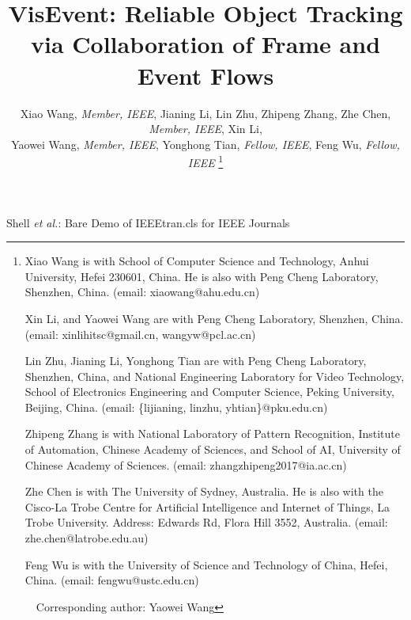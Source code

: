 \documentclass[journal]{IEEEtran}
\begin{document}
\title{VisEvent: Reliable Object Tracking via Collaboration of Frame and Event Flows} 

\author{Xiao Wang, \emph{Member, IEEE}, Jianing Li, Lin Zhu, Zhipeng Zhang, Zhe Chen, \emph{Member, IEEE},  Xin Li, \\ 
Yaowei Wang, \emph{Member, IEEE}, Yonghong Tian, \emph{Fellow, IEEE}, Feng Wu, \emph{Fellow, IEEE} 
\thanks{
Xiao Wang is with School of Computer Science and Technology, Anhui University, Hefei 230601, China. He is also with Peng Cheng Laboratory, Shenzhen, China. (email: xiaowang@ahu.edu.cn) 

Xin Li, and Yaowei Wang are with Peng Cheng Laboratory, Shenzhen, China. (email: xinlihitsc@gmail.cn, wangyw@pcl.ac.cn) 

Lin Zhu, Jianing Li, Yonghong Tian are with Peng Cheng Laboratory, Shenzhen, China, and National Engineering Laboratory for Video Technology, School of Electronics Engineering and Computer Science, Peking University, Beijing, China. (email: \{lijianing, linzhu, yhtian\}@pku.edu.cn) 

Zhipeng Zhang is with National Laboratory of Pattern Recognition, Institute of Automation, Chinese Academy of Sciences, and School of AI, University of Chinese Academy of Sciences. (email: zhangzhipeng2017@ia.ac.cn)  

Zhe Chen is with The University of Sydney, Australia. He is also with the Cisco-La Trobe Centre for Artificial Intelligence and Internet of Things, La Trobe University. Address: Edwards Rd, Flora Hill 3552, Australia. (email: zhe.chen@latrobe.edu.au)

Feng Wu is with the University of Science and Technology of China, Hefei, China. (email: fengwu@ustc.edu.cn) 

\Letter~~Corresponding author: Yaowei Wang  
}}



{Shell \MakeLowercase{\textit{et al.}}: Bare Demo of IEEEtran.cls for IEEE Journals}

\maketitle
\end{document}
